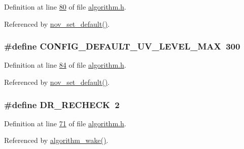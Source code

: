 Definition at line \hyperlink{a00021_source_l00080}{80} of file \hyperlink{a00021_source}{algorithm.\+h}.



Referenced by \hyperlink{a00060_source_l00760}{nov\+\_\+set\+\_\+default()}.

\hypertarget{a00021_a29f761c18bae89d087200e4f1891c651}{
\subsubsection[{C\+O\+N\+F\+I\+G\+\_\+\+D\+E\+F\+A\+U\+L\+T\+\_\+\+U\+V\+\_\+\+L\+E\+V\+E\+L\+\_\+\+M\+A\+X}]{\setlength{\rightskip}{0pt plus 5cm}\#define C\+O\+N\+F\+I\+G\+\_\+\+D\+E\+F\+A\+U\+L\+T\+\_\+\+U\+V\+\_\+\+L\+E\+V\+E\+L\+\_\+\+M\+A\+X~300}}\label{a00021_a29f761c18bae89d087200e4f1891c651}


Definition at line \hyperlink{a00021_source_l00084}{84} of file \hyperlink{a00021_source}{algorithm.\+h}.



Referenced by \hyperlink{a00060_source_l00760}{nov\+\_\+set\+\_\+default()}.

\hypertarget{a00021_a6e67f9a00e51668436c0395616f43e88}{
\subsubsection[{D\+R\+\_\+\+R\+E\+C\+H\+E\+C\+K}]{\setlength{\rightskip}{0pt plus 5cm}\#define D\+R\+\_\+\+R\+E\+C\+H\+E\+C\+K~2}}\label{a00021_a6e67f9a00e51668436c0395616f43e88}


Definition at line \hyperlink{a00021_source_l00071}{71} of file \hyperlink{a00021_source}{algorithm.\+h}.



Referenced by \hyperlink{a00038_source_l00670}{algorithm\+\_\+wake()}.

